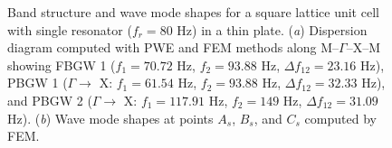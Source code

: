 \documentclass{article}
\begin{document}
\begin{figure}[t]
\caption{Band structure and wave mode shapes for a square lattice unit cell with single resonator ($f_r = 80$ Hz) in a thin plate. (\textit{a}) Dispersion diagram computed with PWE and FEM methods along M--$\Gamma$--X--M showing FBGW 1 ($f_1 = 70.72$ Hz, $f_2 = 93.88$ Hz, $\Delta f_{12} = 23.16$ Hz), PBGW 1 ($\Gamma \rightarrow$ X: $f_1 = 61.54$ Hz, $f_2 = 93.88$ Hz, $\Delta f_{12} = 32.33$ Hz), and PBGW 2 ($\Gamma \rightarrow$ X: $f_1 = 117.91$ Hz, $f_2 = 149$ Hz, $\Delta f_{12} = 31.09$ Hz). (\textit{b}) Wave mode shapes at points $A_s$, $B_s$, and $C_s$ computed by FEM.}
\label{pwe_fem_disp_modal_square}
\end{figure}
\end{document}
